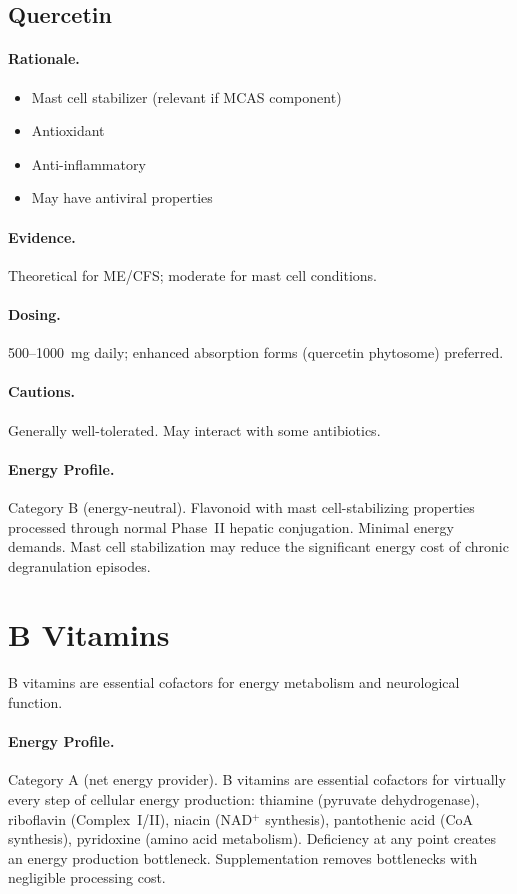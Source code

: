 \subsection{Quercetin}

\paragraph{Rationale.}
\begin{itemize}
    \item Mast cell stabilizer (relevant if MCAS component)
    \item Antioxidant
    \item Anti-inflammatory
    \item May have antiviral properties
\end{itemize}

\paragraph{Evidence.} Theoretical for ME/CFS; moderate for mast cell conditions.

\paragraph{Dosing.} 500--1000~mg daily; enhanced absorption forms (quercetin phytosome) preferred.

\paragraph{Cautions.} Generally well-tolerated. May interact with some antibiotics.

\paragraph{Energy Profile.}
Category B (energy-neutral). Flavonoid with mast cell-stabilizing properties processed through normal Phase~II hepatic conjugation. Minimal energy demands. Mast cell stabilization may reduce the significant energy cost of chronic degranulation episodes.

\section{B Vitamins}
\label{sec:vitamins}

B vitamins are essential cofactors for energy metabolism and neurological function.

\paragraph{Energy Profile.}
Category A (net energy provider). B vitamins are essential cofactors for virtually every step of cellular energy production: thiamine (pyruvate dehydrogenase), riboflavin (Complex~I/II), niacin (NAD$^+$ synthesis), pantothenic acid (CoA synthesis), pyridoxine (amino acid metabolism). Deficiency at any point creates an energy production bottleneck. Supplementation removes bottlenecks with negligible processing cost.

